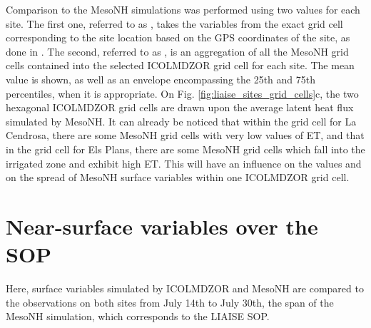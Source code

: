 Comparison to the MesoNH simulations was performed using two values for each site. 
The first one, referred to as \mesoexact, takes the variables from the exact grid cell corresponding to the site location based on the GPS coordinates of the site, as done in \citet{lunel_irrigation_2024}. 
The second, referred to as \mesomean, is an aggregation of all the MesoNH grid cells contained into the selected ICOLMDZOR grid cell for each site. The mean value is shown, as well as an envelope encompassing the 25th and 75th percentiles, when it is appropriate.
On Fig. \ref{fig:liaise_sites_grid_cells}c, the two hexagonal ICOLMDZOR grid cells are drawn upon the average latent heat flux simulated by MesoNH. It can already be noticed that within the grid cell for La Cendrosa, there are some MesoNH grid cells with very low values of ET, and that in the grid cell for Els Plans, there are some MesoNH grid cells which fall into the irrigated zone and exhibit high ET. This will have an influence on the \mesomean values and on the spread of MesoNH surface variables within one ICOLMDZOR grid cell. 

\section{Near-surface variables over the SOP}
\label{sec:sop}

Here, surface variables simulated by ICOLMDZOR and MesoNH are compared to the observations on both sites from July 14th to July 30th, the span of the MesoNH simulation, which corresponds to the LIAISE SOP.

\hfill

